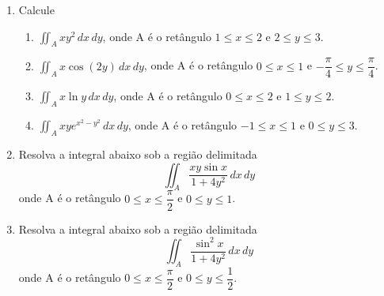 \documentclass[11pt,a4paper]{article}
\begin{document}
\begin{enumerate}
\begin{enumerate}
	\end{enumerate}
	
	\item Calcule 
	
	\begin{enumerate}
		\item $\displaystyle\iint_A xy^2 \,dx\,dy$, onde A é o retângulo $1 \leq x \leq 2$ e $2 \leq y \leq 3$.
		\item $\displaystyle\iint_A x\cos (2y) \,dx\,dy$, onde A é o retângulo $0 \leq x \leq 1$ e $ - \displaystyle\dfrac{\pi}{4} \leq y \leq \displaystyle\dfrac{\pi}{4}$.
		\item $\displaystyle\iint_A x\ln y \,dx\,dy$, onde A é o retângulo $0 \leq x \leq 2$ e $1 \leq y \leq 2$.
		\item $\displaystyle\iint_A xy e^{x^2 - y^2} \,dx\,dy$, onde A é o retângulo $-1 \leq x \leq 1$ e $0 \leq y \leq 3$.
	
	\end{enumerate}	
	
	\item Resolva a integral abaixo sob a região delimitada
	$$\displaystyle\iint_A \displaystyle\dfrac{xy \sin x }{1 + 4y^2} \,dx\,dy$$ onde A é o retângulo $0 \leq x \leq \displaystyle\dfrac{\pi}{2}$ e $0 \leq y \leq 1$.
	
	\item Resolva a integral abaixo sob a região delimitada
	$$\displaystyle\iint_A \displaystyle\dfrac{\sin^2 x }{1 + 4y^2} \,dx\,dy$$ onde A é o retângulo $0 \leq x \leq \displaystyle\dfrac{\pi}{2}$ e $0 \leq y \leq \displaystyle\dfrac{1}{2}$.	
	
	\end{enumerate}
	
\end{document}
